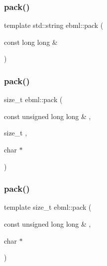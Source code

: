 \mbox{\label{namespaceebml_a1c119d830a8a0d4f83e1362ade4c84ba}} 
\subsubsection{\texorpdfstring{pack()}{pack()}\hspace{0.1cm}{\footnotesize\ttfamily [3/24]}}
{\footnotesize\ttfamily template std\+::string ebml\+::pack (\begin{DoxyParamCaption}\item[{const long long \&}]{ }\end{DoxyParamCaption})}

\mbox{\label{namespaceebml_a71a18263f24d4160b1c97d74273745c7}} 
\subsubsection{\texorpdfstring{pack()}{pack()}\hspace{0.1cm}{\footnotesize\ttfamily [4/24]}}
{\footnotesize\ttfamily size\+\_\+t ebml\+::pack (\begin{DoxyParamCaption}\item[{const unsigned long long \&}]{,  }\item[{size\+\_\+t}]{,  }\item[{char $\ast$}]{ }\end{DoxyParamCaption})}

\mbox{\label{namespaceebml_aefd18e43ba3909d196ab0bfa6d4ab640}} 
\subsubsection{\texorpdfstring{pack()}{pack()}\hspace{0.1cm}{\footnotesize\ttfamily [5/24]}}
{\footnotesize\ttfamily template size\+\_\+t ebml\+::pack (\begin{DoxyParamCaption}\item[{const unsigned long long \&}]{,  }\item[{char $\ast$}]{ }\end{DoxyParamCaption})}

\mbox{\label{namespaceebml_a4792d18415e00b078131b9590e832b9b}} 
